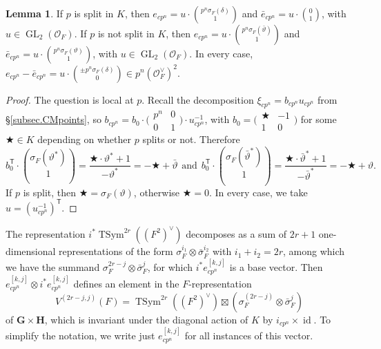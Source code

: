 \documentclass[a4paper]{amsart}
\numberwithin{equation}{section}
\theoremstyle{definition}
\newtheorem{lemma}[theorem]{Lemma}
\DeclareMathOperator{\GL}{GL}
\DeclareMathOperator{\id}{id}
\DeclareMathOperator{\TSym}{TSym}
\begin{document}
\begin{lemma}\label{lem.vartheta} 
If $p$ is split in $K$, then $e_{cp^n}=u\cdot\binom{p^n\sigma_F(\delta)}{1}$ and $\bar{e}_{cp^n}=u\cdot\binom{0}{1}$, with $u\in\GL_2(\mathcal{O}_F)$. If $p$ is not split in $K$, then $e_{cp^n}=u\cdot\binom{p^n\sigma_F(\bar{\vartheta})}{1}$ and $\bar{e}_{cp^n}=u\cdot\binom{p^n\sigma_F(\vartheta)}{1}$, with $u\in\GL_2(\mathcal{O}_F)$. In every case, $e_{cp^n}-\bar{e}_{cp^n}=u\cdot\binom{\pm p^n\sigma_F(\delta)}{0}\in p^n(\mathcal{O}_F^\vee)^2$.
\end{lemma}
\begin{proof}
The question is local at $p$. Recall the decomposition $\xi_{cp^n}=b_{cp^n}u_{cp^n}$ from \S\ref{subsec.CMpoints}, so $b_{cp^n}=b_0\cdot\big(\begin{smallmatrix}p^n & 0 \\ 0 & 1\end{smallmatrix}\big)\cdot u_{cp^n}^{-1}$, with $b_0=\big(\begin{smallmatrix}\bigstar & -1 \\ 1 & 0\end{smallmatrix}\big)$ for some $\bigstar\in K$ depending on whether $p$ splits or not. Therefore \[b_0^\mathsf{T}\cdot\binom{\sigma_F(\vartheta^\ast)}{1}=\dfrac{\bigstar\cdot\vartheta^\ast+1}{-\vartheta^\ast}=-\bigstar+\bar{\vartheta}\hspace{5pt}\text{and}\hspace{5pt}b_0^\mathsf{T}\cdot\binom{\sigma_F(\bar{\vartheta}^\ast)}{1}=\dfrac{\bigstar\cdot\bar{\vartheta}^\ast+1}{-\bar{\vartheta}^\ast}=-\bigstar+{\vartheta}.\]
If $p$ is split, then $\bigstar=\sigma_F(\vartheta)$, otherwise $\bigstar=0$. In every case, we take $u=(u_{cp^n}^{-1})^\mathsf{T}$.
\end{proof}

The representation $i^\ast\TSym^{2r}((F^2)^\vee)$ decomposes as a sum of $2r+1$ one-dimensional representations of the form $\sigma_F^{i_1}\otimes\bar\sigma_F^{i_2}$ with $i_1+i_2=2r$, among which we have the summand $\sigma_F^{2r-j}\otimes\bar\sigma_F^j$, for which $i^\ast e^{[k,j]}_{cp^n}$ is a base vector. Then $e^{[k,j]}_{cp^n}\otimes i^\ast e^{[k,j]}_{cp^n}$ 
defines an element in the $F$-representation 
\[V^{(2r-j,j)}(F)=\TSym^{2r}((F^2)^\vee)\boxtimes(\sigma_F^{(2r-j)}\otimes\bar\sigma_F^{j})\]
of $\mathbf{G}\times\mathbf{H}$, 
which is invariant under the diagonal action of $K$ by $i_{cp^n}\times\id$. To simplify the notation, we write just $e^{[k,j]}_{cp^n}$ for all instances of this vector.
\end{document}
